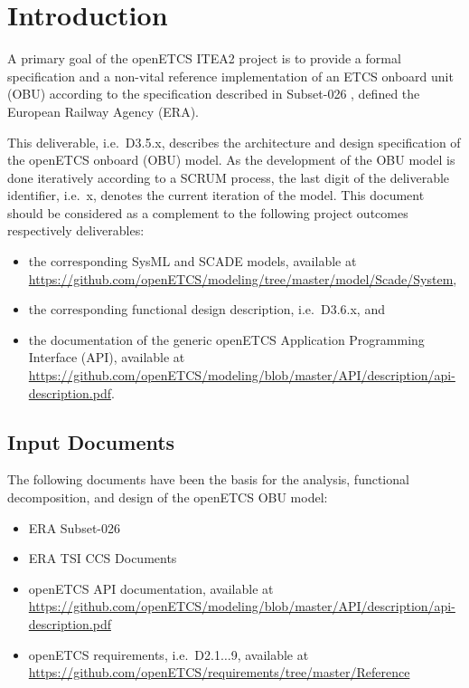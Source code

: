 
\chapter{Introduction}

A primary goal of the openETCS ITEA2 project is to provide a formal specification and a non-vital reference implementation of an ETCS onboard unit (OBU) according to the specification described in Subset-026 \cite{subset-026}, defined the European Railway Agency (ERA). 

This deliverable, i.e.~D3.5.x, describes the architecture and design specification of the openETCS onboard (OBU) model. As the development of the OBU model is done iteratively according to a SCRUM process, the last digit of the deliverable identifier, i.e.~x, denotes the current iteration of the model. This document should be considered as a complement to the following project outcomes respectively deliverables:
\begin{itemize}
\item the corresponding SysML and SCADE models, available at \url{https://github.com/openETCS/modeling/tree/master/model/Scade/System},
\item the corresponding functional design description, i.e.~D3.6.x, and
\item the documentation of the generic openETCS Application Programming Interface (API), available at \url{https://github.com/openETCS/modeling/blob/master/API/description/api-description.pdf}.
\end{itemize}


\section{Input Documents}

The following documents have been the basis for the analysis, functional decomposition, and design of the openETCS OBU model:
\begin{itemize}
\item ERA Subset-026 \cite{subset-026}
\item ERA TSI CCS Documents
\item openETCS API documentation, available at \url{https://github.com/openETCS/modeling/blob/master/API/description/api-description.pdf}
\item openETCS requirements, i.e.~D2.1$\ldots$9, available at \url{https://github.com/openETCS/requirements/tree/master/Reference}
\end{itemize}



